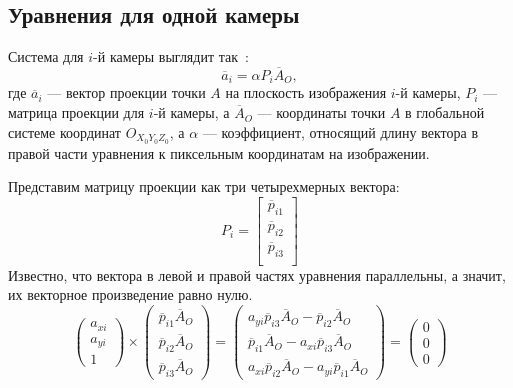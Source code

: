 \documentclass[12pt, a4paper]{article}
\begin{document}
\subsection{Уравнения для одной камеры}
Система для $i$-й камеры выглядит так~\cite{multiview_cv, dlt_temugeb}:
\begin{equation}
    \overline{a}_i = \alpha P_i \overline{A}_O,
\label{eqn:general_dlt}
\end{equation}
где $\overline{a}_i$ --- вектор проекции точки $A$ на плоскость изображения
$i$-й камеры, $P_i$ --- матрица проекции для $i$-й камеры, а $\overline{A}_O$
--- координаты точки $A$ в глобальной системе координат $O_{X_0Y_0Z_0}$, а
$\alpha$ --- коэффициент, относящий длину вектора в правой части уравнения к
пиксельным координатам на изображении.

 Представим матрицу проекции как три четырехмерных вектора:
\begin{equation}
    P_i = \begin{bmatrix}
        \overline{p}_{i1}\\
        \overline{p}_{i2}\\
        \overline{p}_{i3}\\
    \end{bmatrix}
\end{equation}
Известно, что вектора в левой и правой частях уравнения параллельны, а значит,
их векторное произведение равно нулю.
\begin{equation}
    \begin{pmatrix}
        a_{xi}\\
        a_{yi}\\
        1
    \end{pmatrix} \times \begin{pmatrix}
        \overline{p}_{i1} \overline{A}_O\\
        \overline{p}_{i2} \overline{A}_O\\
        \overline{p}_{i3} \overline{A}_O
    \end{pmatrix} = \begin{pmatrix}
        a_{yi} \overline{p}_{i3} \overline{A}_O - \overline{p}_{i2} \overline{A}_O\\
        \overline{p}_{i1} \overline{A}_O - a_{xi} \overline{p}_{i3} \overline{A}_O\\
        a_{xi} \overline{p}_{i2} \overline{A}_O - a_{yi} \overline{p}_{i1} \overline{A}_O
    \end{pmatrix} = \begin{pmatrix}
        0\\
        0\\
        0
    \end{pmatrix}
\label{eqn:full_cross_product}
\end{equation}
\end{document}
